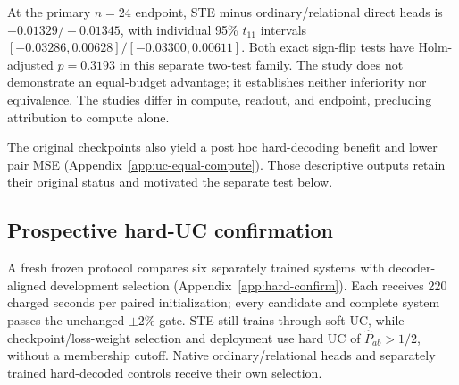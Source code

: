 \begin{table}[t]\centering\scriptsize

\caption{Equal-budget native systems: selective non-singleton UC F1, mean $\pm$ SEM across twelve collections, each averaging three initializations. Only $n=24$ is primary; $n=48$ is descriptive. SEM is not a confidence interval.}
\label{tab:uc-equalcompute-main}\end{table}

At the primary $n=24$ endpoint, STE minus ordinary/relational direct heads is $-0.01329/-0.01345$, with individual 95\% $t_{11}$ intervals $[-0.03286,0.00628]/[-0.03300,0.00611]$. Both exact sign-flip tests have Holm-adjusted $p=0.3193$ in this separate two-test family. The study does not demonstrate an equal-budget advantage; it establishes neither inferiority nor equivalence. The studies differ in compute, readout, and endpoint, precluding attribution to compute alone.

The original checkpoints also yield a post hoc hard-decoding benefit and lower pair MSE (Appendix~\ref{app:uc-equal-compute}). Those descriptive outputs retain their original status and motivated the separate test below.

\subsection{Prospective hard-UC confirmation}\label{sec:hard-confirm}
A fresh frozen protocol compares six separately trained systems with decoder-aligned development selection (Appendix~\ref{app:hard-confirm}). Each receives 220 charged seconds per paired initialization; every candidate and complete system passes the unchanged $\pm2\%$ gate. STE still trains through soft UC, while checkpoint/loss-weight selection and deployment use hard UC of $\widehat P_{ab}>1/2$, without a membership cutoff. Native ordinary/relational heads and separately trained hard-decoded controls receive their own selection.

\begin{table}[t]\centering\scriptsize\setlength{\tabcolsep}{2pt}

\caption{Prospective equal-budget UC systems on selective cores. F1 is mean (SEM) over twelve collections, each averaging three initializations; exact recovery is a percentage. Only STE-hard versus native heads at $n=24$ belongs to the separate two-test primary family; other entries are descriptive.}
\label{tab:hard-confirm-main}\end{table}


